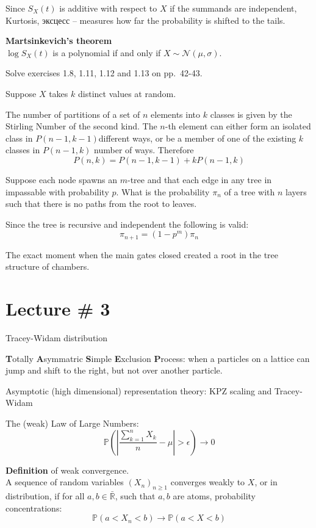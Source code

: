 \documentclass[a4paper]{article}
\newcommand{\brac}[1]{{\left ( #1 \right )}}
\newcommand{\abs}[1]{{\left | #1 \right |}}
\newcommand{\Rbar}{{\bar{\mathbb{R}}}}
\newcommand{\pr}{\mathbb{P}}
\newcommand{\rus}[1]{\foreignlanguage{russian}{#1}}
\begin{document}
Since $S_X(t)$ is additive with respect to $X$ if the summands are independent,
Kurtosis, \rus{эксцесс} -- measures how far the probability is shifted to the tails.

\textbf{Martsinkevich's theorem}\hfill\\
$\log S_X(t)$ is a polynomial if and only if $X\sim\mathcal{N}(\mu,\sigma)$.


Solve exercises 1.8, 1.11, 1.12 and 1.13 on pp.~42-43.


Suppose $X$ takes $k$ distinct values at random. 



The number of partitions of a set of $n$ elements into $k$ classes is given by the Stirling Number of the second kind.
The $n$-th element can either form an isolated class in $P(n-1,k-1)$different ways,
or be a member of one of the existing $k$ classes in $P(n-1,k)$ number of ways.
Therefore \[P(n,k) = P(n-1,k-1) + k P(n-1,k)\]


Suppose each node spawns an $m$-tree and that each edge in any tree in impassable with probability $p$.
What is the probability $\pi_n$ of a tree with $n$ layers such that there is no paths from the root to leaves.

Since the tree is recursive and independent the following is valid:
\[\pi_{n+1} = (1 - p^m) \pi_n\]

The exact moment when the main gates closed created a root in the tree structure of chambers.


\section{Lecture \# 3} %
\label{sec:lecture_3}

Tracey-Widam distribution

\textbf{T}otally \textbf{A}symmatric \textbf{S}imple \textbf{E}xclusion \textbf{P}rocess: when a particles on a lattice can jump and shift to the right, but not over another particle.


Asymptotic (high dimensional) representation theory:
KPZ scaling and Tracey-Widam

The (weak) Law of Large Numbers:
\[\pr\brac{\abs{ \frac{\sum_{k=1}^n X_k}{n}-\mu }>\epsilon} \to 0\]


\noindent \textbf{Definition} of weak convergence. \hfill\\
A sequence of random variables $\brac{X_n}_{n\geq1}$ converges weakly to $X$, or in distribution, if for all $a,b\in \Rbar$, such that $a,b$ are atoms, probability concentrations:
\[\pr\brac{a<X_n<b}\to \pr\brac{a<X<b}\]
\end{document}
